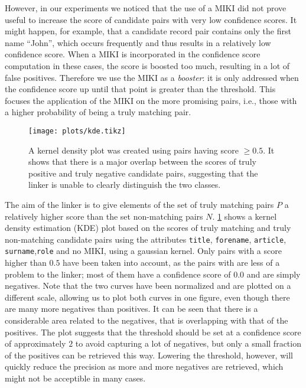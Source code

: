 However, in our experiments we noticed that the use of a MIKI did not prove useful to increase the score of candidate pairs with very low confidence scores.
It might happen, for example, that a candidate record pair contains only the first name ``John'', which occurs frequently and thus results in a relatively low confidence score.
When a MIKI is incorporated in the confidence score computation in these cases, the score is boosted too much, resulting in a lot of false positives.
Therefore we use the MIKI as a \emph{booster}: it is only addressed when the confidence score up until that point is greater than the threshold.
This focuses the application of the MIKI on the more promising pairs, i.e., those with a higher probability of being a truly matching pair.

\begin{figure}
    \centering
    \texttt{[image: plots/kde.tikz]}
    \caption{A kernel density plot was created using pairs having score $\geq 0.5$. It shows that there is a major overlap between the scores of truly positive and truly negative candidate pairs, suggesting that the linker is unable to clearly distinguish the two classes.}
    \label{fig:kde}
\end{figure}

The aim of the linker is to give elements of the set of truly matching pairs $P$ a relatively higher score than the set non-matching pairs $N$.
\cref{fig:kde} shows a kernel density estimation (KDE) plot based on the scores of truly matching and truly non-matching candidate pairs using the attributes \texttt{title}, \texttt{forename}, \texttt{article}, \texttt{surname},\texttt{role} and no MIKI, using a gaussian kernel.
Only pairs with a score higher than $0.5$ have been taken into account, as the pairs with are less of a problem to the linker; most of them have a confidence score of $0.0$ and are simply negatives.
Note that the two curves have been normalized and are plotted on a different scale, allowing us to plot both curves in one figure, even though there are many more negatives than positives.
It can be seen that there is a considerable area related to the negatives, that is overlapping with that of the positives.
The plot suggests that the threshold should be set at a confidence score of approximately $2$ to avoid capturing a lot of negatives, but only a small fraction of the positives can be retrieved this way.
Lowering the threshold, however, will quickly reduce the precision as more and more negatives are retrieved, which might not be acceptible in many cases.

